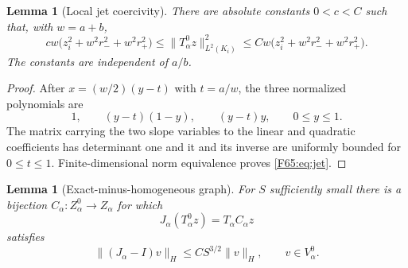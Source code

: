 \documentclass[11pt]{amsart}
\numberwithin{equation}{section}
\newtheorem{lemma}[theorem]{Lemma}
\theoremstyle{definition}
\theoremstyle{remark}
\begin{document}
\begin{lemma}[Local jet coercivity]\label{F65:lem:jet}
There are absolute constants $0<c<C$ such that, with $w=a+b$,
\begin{equation}\label{F65:eq:jet}
 cw\bigl(z_i^2+w^2r_-^2+w^2r_+^2\bigr)
 \le\|T_\alpha^0z\|_{L^2(K_i)}^2
 \le Cw\bigl(z_i^2+w^2r_-^2+w^2r_+^2\bigr).
\end{equation}
The constants are independent of $a/b$.
\end{lemma}

\begin{proof}
After $x=(w/2)(y-t)$ with $t=a/w$, the three normalized polynomials are
\begin{equation}
 1,\qquad (y-t)(1-y),\qquad (y-t)y,
 \qquad 0\le y\le1.
\end{equation}
The matrix carrying the two slope variables to the linear and quadratic
coefficients has determinant one and it and its inverse are uniformly
bounded for $0\le t\le1$.  Finite-dimensional norm equivalence proves
\eqref{F65:eq:jet}.
\end{proof}

\begin{lemma}[Exact-minus-homogeneous graph]\label{F65:lem:graph}
For $S$ sufficiently small there is a bijection
$C_\alpha:Z_\alpha^0\to Z_\alpha$ for which
\begin{equation}
 J_\alpha(T_\alpha^0z)=T_\alpha C_\alpha z
\end{equation}
satisfies
\begin{equation}\label{F65:eq:Jclose}
 \|(J_\alpha-I)v\|_H\le CS^{3/2}\|v\|_H,
 \qquad v\in V_\alpha^0.
\end{equation}
\end{lemma}
\end{document}
